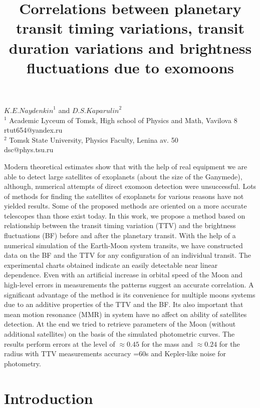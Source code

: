 \documentclass[12pt]{article}
\begin{document}
 
  
\title{Correlations between planetary transit timing variations,
transit duration variations and brightness fluctuations due to exomoons}
 \maketitle
 \centering
   ${K.E. Naydenkin}^1$ 
   and
      ${D.S. Kaparulin}^2$ \\
   ${}^1$ Academic Lyceum of Tomsk, High school of Physics and Math, Vavilova 8\\
rtut654@yandex.ru\\
${}^2$ Tomsk State University, Physics Faculty, Lenina av. 50\\ dsc@phys.tsu.ru
 
  \abstract
  
   {Modern theoretical estimates show that with the help of real equipment we are able to detect large satellites of exoplanets (about the size of the Ganymede), although, numerical attempts of direct exomoon detection were unsuccessful. Lots of methods for finding the satellites of exoplanets for various reasons have not yielded results. Some of the proposed methods are oriented on a more accurate telescopes than those exist today.
In this work, we propose a method based on relationship between the transit timing variation (TTV) and the brightness fluctuations (BF) before and after the planetary transit. With the help of a numerical simulation of the Earth-Moon system transits, we have constructed data on the BF and the TTV for any configuration of an individual transit. The experimental charts obtained indicate an easily detectable near linear dependence. Even with an artificial increase in orbital speed of the Moon and high-level errors in measurements the patterns suggest an accurate correlation.   
A significant advantage of the method is its convenience for multiple moons systems due to an additive properties of the TTV and the BF. Its also important that mean motion resonance (MMR) in system have no affect on ability of satellites detection.  
At the end we tried to retrieve parameters of the Moon (without additional satellites) on the basis of the simulated photometric curves. The results perform errors at the level of $\approx 0.45$ for the mass and $\approx 0.24$ for the radius with TTV measurements accuracy =60s and Kepler-like noise for photometry.

}
 
 \section{Introduction }
\end{document}
